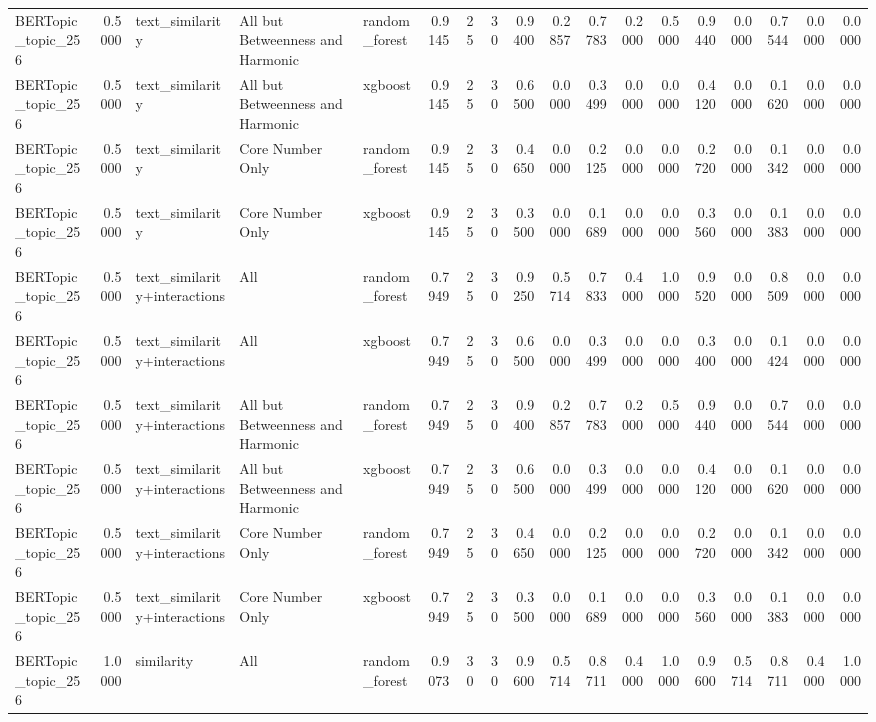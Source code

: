 \begin{tabular}{lrlllrrrrrrrrrrrrr}
BERTopic_topic_256 & 0.5000 & text_similarity & All but Betweenness and Harmonic & random_forest & 0.9145 & 25 & 30 & 0.9400 & 0.2857 & 0.7783 & 0.2000 & 0.5000 & 0.9440 & 0.0000 & 0.7544 & 0.0000 & 0.0000 \\
BERTopic_topic_256 & 0.5000 & text_similarity & All but Betweenness and Harmonic & xgboost & 0.9145 & 25 & 30 & 0.6500 & 0.0000 & 0.3499 & 0.0000 & 0.0000 & 0.4120 & 0.0000 & 0.1620 & 0.0000 & 0.0000 \\
BERTopic_topic_256 & 0.5000 & text_similarity & Core Number Only & random_forest & 0.9145 & 25 & 30 & 0.4650 & 0.0000 & 0.2125 & 0.0000 & 0.0000 & 0.2720 & 0.0000 & 0.1342 & 0.0000 & 0.0000 \\
BERTopic_topic_256 & 0.5000 & text_similarity & Core Number Only & xgboost & 0.9145 & 25 & 30 & 0.3500 & 0.0000 & 0.1689 & 0.0000 & 0.0000 & 0.3560 & 0.0000 & 0.1383 & 0.0000 & 0.0000 \\
BERTopic_topic_256 & 0.5000 & text_similarity+interactions & All & random_forest & 0.7949 & 25 & 30 & 0.9250 & 0.5714 & 0.7833 & 0.4000 & 1.0000 & 0.9520 & 0.0000 & 0.8509 & 0.0000 & 0.0000 \\
BERTopic_topic_256 & 0.5000 & text_similarity+interactions & All & xgboost & 0.7949 & 25 & 30 & 0.6500 & 0.0000 & 0.3499 & 0.0000 & 0.0000 & 0.3400 & 0.0000 & 0.1424 & 0.0000 & 0.0000 \\
BERTopic_topic_256 & 0.5000 & text_similarity+interactions & All but Betweenness and Harmonic & random_forest & 0.7949 & 25 & 30 & 0.9400 & 0.2857 & 0.7783 & 0.2000 & 0.5000 & 0.9440 & 0.0000 & 0.7544 & 0.0000 & 0.0000 \\
BERTopic_topic_256 & 0.5000 & text_similarity+interactions & All but Betweenness and Harmonic & xgboost & 0.7949 & 25 & 30 & 0.6500 & 0.0000 & 0.3499 & 0.0000 & 0.0000 & 0.4120 & 0.0000 & 0.1620 & 0.0000 & 0.0000 \\
BERTopic_topic_256 & 0.5000 & text_similarity+interactions & Core Number Only & random_forest & 0.7949 & 25 & 30 & 0.4650 & 0.0000 & 0.2125 & 0.0000 & 0.0000 & 0.2720 & 0.0000 & 0.1342 & 0.0000 & 0.0000 \\
BERTopic_topic_256 & 0.5000 & text_similarity+interactions & Core Number Only & xgboost & 0.7949 & 25 & 30 & 0.3500 & 0.0000 & 0.1689 & 0.0000 & 0.0000 & 0.3560 & 0.0000 & 0.1383 & 0.0000 & 0.0000 \\
BERTopic_topic_256 & 1.0000 & similarity & All & random_forest & 0.9073 & 30 & 30 & 0.9600 & 0.5714 & 0.8711 & 0.4000 & 1.0000 & 0.9600 & 0.5714 & 0.8711 & 0.4000 & 1.0000 \\

\end{tabular}
